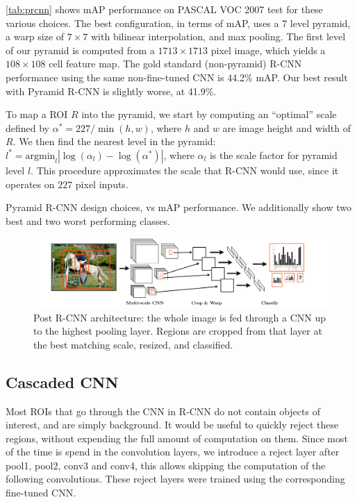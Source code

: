 \autoref{tab:prcnn} shows mAP performance on PASCAL VOC 2007 test for these various choices.
The best configuration, in terms of mAP, uses a 7 level pyramid, a warp size of $7 \times 7$ with bilinear interpolation, and max pooling.
The first level of our pyramid is computed from a $1713 \times 1713$ pixel image, which yields a $108 \times 108$ cell feature map.
The gold standard (non-pyramid) R-CNN performance using the same non-fine-tuned CNN is 44.2\% mAP.
Our best result with Pyramid R-CNN is slightly worse, at 41.9\%.

To map a ROI $R$ into the pyramid, we start by computing an ``optimal'' scale defined by $\alpha^* = 227/\min(h,w)$, where $h$ and $w$ are image height and width of $R$.
We then find the nearest level in the pyramid: $l^* = \textrm{argmin}_l |\log(\alpha_l) - \log(\alpha^*)|$, where $\alpha_l$ is the scale factor for pyramid level $l$.
This procedure approximates the scale that R-CNN would use, since it operates on $227$ pixel inputs.

\begin{table}[ht]
\centering
\caption{
    Pyramid R-CNN design choices, vs mAP performance.
    We additionally show two best and two worst performing classes.
}\label{tab:prcnn}
\small{

}
\end{table}

\begin{figure}[h!]
\begin{center}
\includegraphics[width=0.98\columnwidth]{figures/dense_rcnn.pdf}
\caption{
Post R-CNN architecture: the whole image is fed through a CNN up to the highest pooling layer.
Regions are cropped from that layer at the best matching scale, resized, and classified.
}\label{fig:dense_rcnn}
\end{center}
\end{figure}

\subsection{Cascaded CNN}\label{sec:ccnn}

Most ROIs that go through the CNN in R-CNN do not contain objects of interest, and are simply background.
It would be useful to quickly reject these regions, without expending the full amount of computation on them. Since most of the time is spend in the convolution layers, we introduce a reject layer after pool1, pool2, conv3 and conv4, this allows skipping the computation of the following convolutions. These reject layers were trained using the corresponding fine-tuned CNN.

